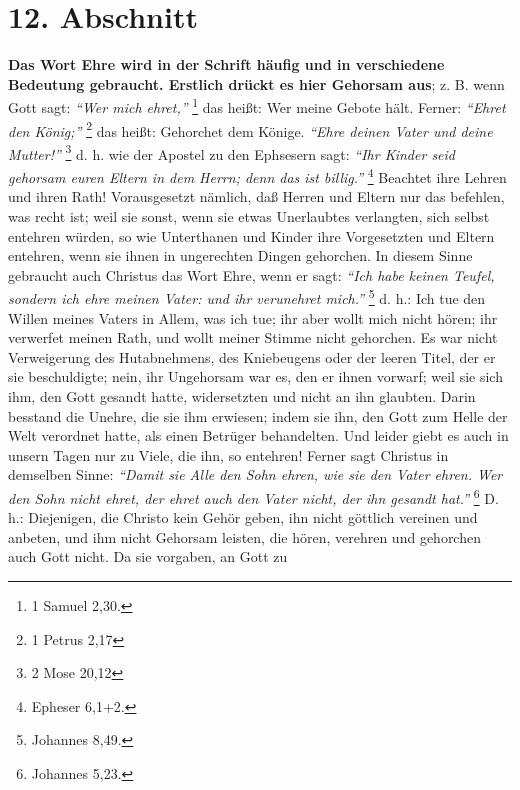 \section{12. Abschnitt} \label{kap9_ab12}

 \textbf{Das Wort Ehre wird in der Schrift häufig und in verschiedene Bedeutung
gebraucht. Erstlich drückt es hier Gehorsam aus}; z. B. wenn Gott sagt:
\textit{"`Wer mich ehret,"'}
\footnote{1 Samuel 2,30.}
das heißt: Wer meine Gebote hält. Ferner:
\textit{"`Ehret den König;"'}
\footnote{1 Petrus 2,17}
das heißt: Gehorchet dem Könige.
\textit{"`Ehre deinen Vater und  deine Mutter!"'}
\footnote{2 Mose 20,12}
d. h. wie der
Apostel zu den Ephsesern sagt:
\textit{"`Ihr Kinder seid gehorsam euren Eltern in dem
Herrn; denn das ist billig."'}
\footnote{Epheser 6,1+2.}
Beachtet ihre Lehren und
ihren Rath! Vorausgesetzt nämlich, daß Herren und Eltern nur das befehlen, was
recht ist; weil sie sonst, wenn sie etwas Unerlaubtes verlangten, sich selbst
entehren würden, so wie Unterthanen und Kinder ihre Vorgesetzten und Eltern
entehren, wenn sie ihnen in ungerechten Dingen gehorchen. In diesem Sinne
gebraucht auch Christus das Wort Ehre, wenn er sagt:
\textit{"`Ich habe keinen Teufel,
sondern ich ehre meinen Vater: und ihr verunehret mich."'}
\footnote{Johannes 8,49.}
d. h.: Ich tue den Willen meines Vaters in Allem, was ich tue; ihr aber wollt
mich nicht hören; ihr verwerfet meinen Rath, und wollt meiner Stimme nicht
gehorchen. Es war nicht Verweigerung des Hutabnehmens, des Kniebeugens oder der
leeren Titel, der er sie beschuldigte; nein, ihr Ungehorsam war es, den er ihnen
vorwarf; weil sie sich ihm, den Gott gesandt hatte, widersetzten und nicht an
ihn glaubten. Darin besstand die Unehre, die sie ihm erwiesen; indem sie ihn,
den Gott zum Helle der Welt verordnet hatte, als einen Betrüger behandelten. Und
leider giebt es auch in unsern Tagen nur zu Viele, die ihn, so entehren! Ferner
sagt Christus in demselben Sinne:
\textit{"`Damit sie Alle den Sohn ehren, wie sie den
Vater ehren. Wer den Sohn nicht ehret, der ehret auch den Vater nicht, der ihn
gesandt hat."'}
\footnote{Johannes 5,23.}
D. h.: Diejenigen, die Christo kein Gehör
geben, ihn nicht göttlich vereinen und anbeten, und ihm nicht Gehorsam leisten,
die hören, verehren und gehorchen auch Gott nicht. Da sie vorgaben, an Gott zu
